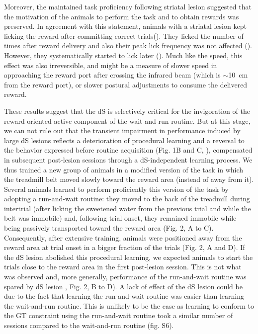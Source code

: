 
Moreover, the maintained task proficiency following striatal lesion suggested that the motivation of the animals to perform the task and to obtain rewards was preserved.
In agreement with this statement, animals with a striatal lesion kept licking the reward after committing correct trials().
They licked the number of times after reward delivery and also their peak lick frequency was not affected ().
However, they systematically started to lick later ().
Much like the speed, this effect was also irreversible, and might be a measure of slower speed in approaching the reward port after crossing the infrared beam (which is $\sim$10~cm from the reward port), or slower postural adjustments to consume the delivered reward.
\par

These results suggest that the dS is selectively critical for the invigoration of the reward-oriented active component of the wait-and-run routine.
But at this stage, we can not rule out that the transient impairment in performance induced by large dS lesions reflects a deterioration of procedural learning and a reversal to the behavior expressed before routine acquisition (Fig. 1B and C, \cite{Dhawale2019}), compensated in subsequent post-lesion sessions through a dS-independent learning process.
We thus trained a new group of animals in a modified version of the task in which the treadmill belt moved slowly toward the reward area (instead of away from it).
Several animals learned to perform proficiently this version of the task by adopting a run-and-wait routine: they moved to the back of the treadmill during intertrial (after licking the sweetened water from the previous trial and while the belt was immobile) and, following trial onset, they remained immobile while being passively transported toward the reward area (Fig. 2, A to C).
Consequently, after extensive training, animals were positioned away from the reward area at trial onset in a bigger fraction of the trials (Fig. 2, A and D). 
If the dS lesion abolished this procedural learning, we expected animals to start the trials close to the reward area in the first post-lesion session. 
This is not what was observed and, more generally, performance of the run-and-wait routine was spared by dS lesion , Fig. 2, B to D).
A lack of effect of the dS lesion could be due to the fact that learning the run-and-wait routine was easier than learning the wait-and-run routine. 
This is unlikely to be the case as learning to conform to the GT constraint using the run-and-wait routine took a similar number of sessions compared to the wait-and-run routine (fig. S6).








